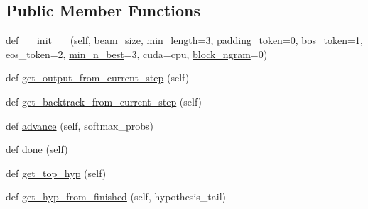 \subsection*{Public Member Functions}
\begin{DoxyCompactItemize}
\item 
def \hyperlink{classprojects_1_1controllable__dialogue_1_1controllable__seq2seq_1_1controllable__seq2seq_1_1Beam_ad750b2491841b08785706eb6e8fff097}{\+\_\+\+\_\+init\+\_\+\+\_\+} (self, \hyperlink{classprojects_1_1controllable__dialogue_1_1controllable__seq2seq_1_1controllable__seq2seq_1_1Beam_a5f3c88ef77b2609a31207f2d2e087442}{beam\+\_\+size}, \hyperlink{classprojects_1_1controllable__dialogue_1_1controllable__seq2seq_1_1controllable__seq2seq_1_1Beam_a07f442d264c6a34a296b9377885e812d}{min\+\_\+length}=3, padding\+\_\+token=0, bos\+\_\+token=1, eos\+\_\+token=2, \hyperlink{classprojects_1_1controllable__dialogue_1_1controllable__seq2seq_1_1controllable__seq2seq_1_1Beam_ad715f2d5f641843da30a95933c522384}{min\+\_\+n\+\_\+best}=3, cuda=\textquotesingle{}cpu\textquotesingle{}, \hyperlink{classprojects_1_1controllable__dialogue_1_1controllable__seq2seq_1_1controllable__seq2seq_1_1Beam_a6f281e607c65ed2d1ba434f64d6577d9}{block\+\_\+ngram}=0)
\item 
def \hyperlink{classprojects_1_1controllable__dialogue_1_1controllable__seq2seq_1_1controllable__seq2seq_1_1Beam_a2ed0d78713409a6ded788ece3d325b0c}{get\+\_\+output\+\_\+from\+\_\+current\+\_\+step} (self)
\item 
def \hyperlink{classprojects_1_1controllable__dialogue_1_1controllable__seq2seq_1_1controllable__seq2seq_1_1Beam_a614a1a51ed1ac7e209282dc223f4c8fc}{get\+\_\+backtrack\+\_\+from\+\_\+current\+\_\+step} (self)
\item 
def \hyperlink{classprojects_1_1controllable__dialogue_1_1controllable__seq2seq_1_1controllable__seq2seq_1_1Beam_ae605905ec50225724e1b54e557009539}{advance} (self, softmax\+\_\+probs)
\item 
def \hyperlink{classprojects_1_1controllable__dialogue_1_1controllable__seq2seq_1_1controllable__seq2seq_1_1Beam_a11a1f8185f11636128be8c25b1d2d56a}{done} (self)
\item 
def \hyperlink{classprojects_1_1controllable__dialogue_1_1controllable__seq2seq_1_1controllable__seq2seq_1_1Beam_a9b904d4d56ca519849dbb3c3d51ebc68}{get\+\_\+top\+\_\+hyp} (self)
\item 
def \hyperlink{classprojects_1_1controllable__dialogue_1_1controllable__seq2seq_1_1controllable__seq2seq_1_1Beam_aa08bbb58c9c95ff74ece3d13f8942ec0}{get\+\_\+hyp\+\_\+from\+\_\+finished} (self, hypothesis\+\_\+tail)

\end{DoxyCompactItemize}
